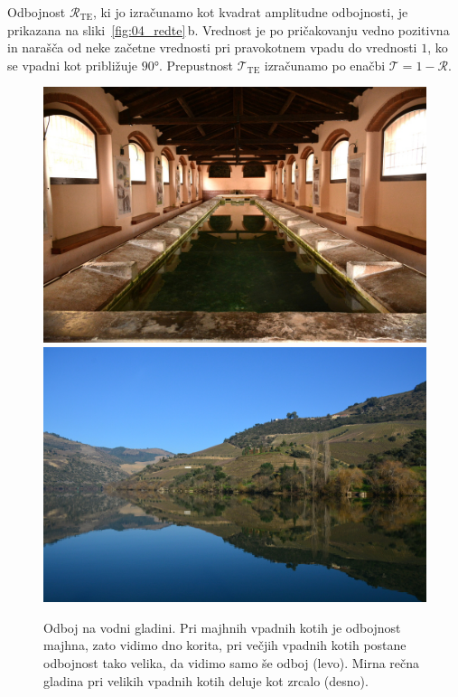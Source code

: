 Odbojnost $\mathcal{R}_\mathrm{TE}$, ki jo izračunamo kot kvadrat amplitudne odbojnosti,
je prikazana na sliki~\ref{fig:04_redte}\,b. Vrednost je po pričakovanju
vedno pozitivna in narašča od neke začetne vrednosti pri pravokotnem
vpadu do vrednosti $1$, ko se vpadni kot približuje $90\si{\degree}$. Prepustnost
$\mathcal{T}_\mathrm{TE}$ izračunamo po enačbi $\mathcal{T} = 1 -\mathcal{R}$. 
\begin{figure}[ht]
\centering
\includegraphics[width=7truecm]{slike/04_OdbojFoto.jpg}\hfill
\includegraphics[width=7truecm]{slike/04_Douro.jpeg}
\caption{Odboj na vodni gladini. Pri majhnih vpadnih kotih je odbojnost
majhna, zato vidimo dno korita, pri večjih
vpadnih kotih postane odbojnost tako velika, da vidimo samo še odboj (levo).
Mirna rečna gladina pri velikih vpadnih kotih deluje kot zrcalo (desno).}
\label{fig:04_OdbojFoto}
\end{figure}

